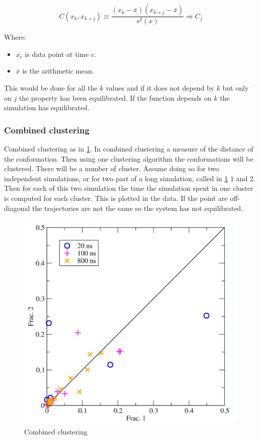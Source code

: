 		$$C(x_k, x_{k+j}) \equiv\frac{\bar{(x_k-\bar{x})(x_{k+j}-\bar{x})}}{s^2(x)}\Rightarrow C_j$$

		Where:

		\begin{multicols}{2}
			\begin{itemize}
				\item $x_c$ is data point at time $c$.
				\item $\bar{x}$ is the arithmetic mean.
			\end{itemize}
		\end{multicols}

		This would be done for all the $k$ values and if it does not depend by $k$ but only on $j$ the property has been equilibrated.
		If the function depends on $k$ the simulation has equilibrated.

		\subsubsection{Combined clustering}
		Combined clustering as in \ref{fig:independent_simulation}.
		In combined clustering a measure of the distance of the conformation.
		Then using one clustering algorithm the conformations will be clustered.
		There will be a number of cluster.
		Assume doing so for two independent simulations, or for two part of a long simulation, called in \ref{fig:independent_simulation} $1$ and $2$.
		Then for each of this two simulation the time the simulation spent in one cluster is computed for each cluster.
		This is plotted in the data.
		If the point are off-diagonal the trajectories are not the same so the system has not equilibrated.

		\begin{figure}[H]
			\includegraphics[width = \textwidth]{independent-simulations}
			\caption{Combined clustering}
			\label{fig:independent_simulation}
		\end{figure}

